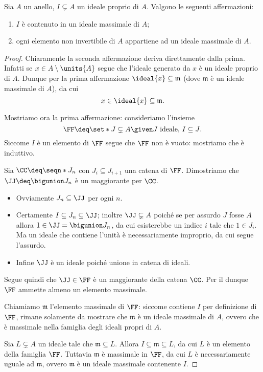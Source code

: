 \begin{proposition}
    Sia $A$ un anello, $I \subsetneq A$ un ideale proprio di $A$. Valgono le seguenti affermazioni:
    \begin{enumerate}[label={(\arabic*)}]
        \item $I$ è contenuto in un ideale massimale di $A$;
        \item ogni elemento non invertibile di $A$ appartiene ad un ideale massimale di $A$.
    \end{enumerate} 
\end{proposition}
\begin{proof}
    Chiaramente la seconda affermazione deriva direttamente dalla prima. Infatti se $x \in A \setminus \units{A}$ segue che l'ideale generato da $x$ è un ideale proprio di $A$. Dunque per la prima affermazione $\ideal{x} \subseteq \mathfrak{m}$ (dove $\mathfrak{m}$ è un ideale massimale di $A$), da cui \[
        x \in \ideal{x} \subseteq \mathfrak{m}.    
    \]

    Mostriamo ora la prima affermazione: consideriamo l'insieme \[
        \FF \deq \set*{J \subsetneq A \given J \text{ ideale, } I \subseteq J}.    
    \] Siccome $I$ è un elemento di $\FF$ segue che $\FF$ non è vuoto: mostriamo che è induttivo.

    Sia $\CC \deq \seqn*{J_n}$ con $J_i \subseteq J_{i+1}$ una catena di $\FF$. Dimostriamo che $\JJ \deq \bigunion J_n$ è un maggiorante per $\CC$.
    \begin{itemize}
        \item Ovviamente $J_n \subseteq \JJ$ per ogni $n$.
        \item Certamente $I \subseteq J_n \subseteq \JJ$; inoltre $\JJ \subsetneq A$ poiché se per assurdo $J$ fosse $A$ allora $1 \in \JJ = \bigunion J_n$, da cui esisterebbe un indice $i$ tale che $1 \in J_i$. Ma un ideale che contiene l'unità è necessariamente improprio, da cui segue l'assurdo.
        \item Infine $\JJ$ è un ideale poiché unione in catena di ideali.
    \end{itemize}
    Segue quindi che $\JJ \in \FF$ è un maggiorante della catena $\CC$. Per il  dunque $\FF$ ammette almeno un elemento massimale.

    Chiamiamo $\mathfrak{m}$ l'elemento massimale di $\FF$: siccome contiene $I$ per definizione di $\FF$, rimane solamente da mostrare che $\mathfrak{m}$ è un ideale massimale di $A$, ovvero che è massimale nella famiglia degli ideali propri di $A$.

    Sia $L \subsetneq A$ un ideale tale che $\mathfrak{m} \subseteq L$. Allora $I \subseteq \mathfrak{m} \subseteq L$, da cui $L$ è un elemento della famiglia $\FF$. Tuttavia $\mathfrak{m}$ è massimale in $\FF$, da cui $L$ è necessariamente uguale ad $\mathfrak{m}$, ovvero $\mathfrak{m}$ è un ideale massimale contenente $I$.
\end{proof}

